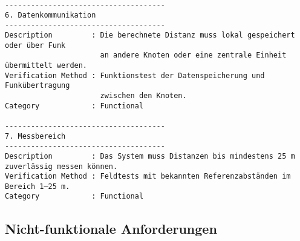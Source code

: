 \begin{verbatim}
-------------------------------------
6. Datenkommunikation
-------------------------------------
Description         : Die berechnete Distanz muss lokal gespeichert oder über Funk 
                      an andere Knoten oder eine zentrale Einheit übermittelt werden.
Verification Method : Funktionstest der Datenspeicherung und Funkübertragung 
                      zwischen den Knoten.
Category            : Functional

-------------------------------------
7. Messbereich
-------------------------------------
Description         : Das System muss Distanzen bis mindestens 25 m zuverlässig messen können.
Verification Method : Feldtests mit bekannten Referenzabständen im Bereich 1–25 m.
Category            : Functional
\end{verbatim}


\subsection{Nicht-funktionale Anforderungen}


